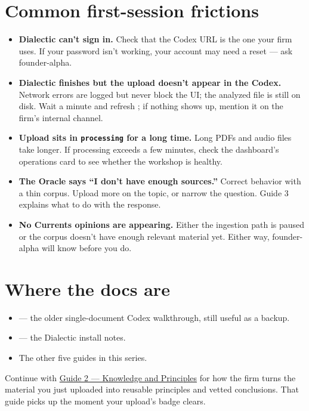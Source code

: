 \documentclass[11pt]{article}
\begin{document}
\section{Common first-session frictions}

\begin{itemize}[leftmargin=*,itemsep=0.3em]
  \item \textbf{Dialectic can't sign in.} Check that the Codex URL is
        the one your firm uses. If your password isn't working, your
        account may need a reset --- ask founder-alpha.
  \item \textbf{Dialectic finishes but the upload doesn't appear in
        the Codex.} Network errors are logged but never block the UI;
        the analyzed file is still on disk. Wait a minute and refresh
        ; if nothing shows up, mention it on the firm's
        internal channel.
  \item \textbf{Upload sits in \texttt{processing} for a long time.}
        Long PDFs and audio files take longer. If processing exceeds
        a few minutes, check the dashboard's operations card to see
        whether the workshop is healthy.
  \item \textbf{The Oracle says ``I don't have enough sources.''}
        Correct behavior with a thin corpus. Upload more on the topic,
        or narrow the question. Guide 3 explains what to do with the
        response.
  \item \textbf{No Currents opinions are appearing.} Either the
        ingestion path is paused or the corpus doesn't have enough
        relevant material yet. Either way, founder-alpha will know
        before you do.
\end{itemize}

\section{Where the docs are}

\begin{itemize}[leftmargin=*,itemsep=0.2em]
  \item {} --- the older
        single-document Codex walkthrough, still useful as a backup.
  \item {} --- the Dialectic install notes.
  \item The other five guides in this series.
\end{itemize}

\begin{nextup}
Continue with \href{02_Knowledge_and_Principles.pdf}{Guide 2 ---
Knowledge and Principles} for how the firm turns the material you
just uploaded into reusable principles and vetted conclusions. That
guide picks up the moment your upload's badge clears.
\end{nextup}
\end{document}
